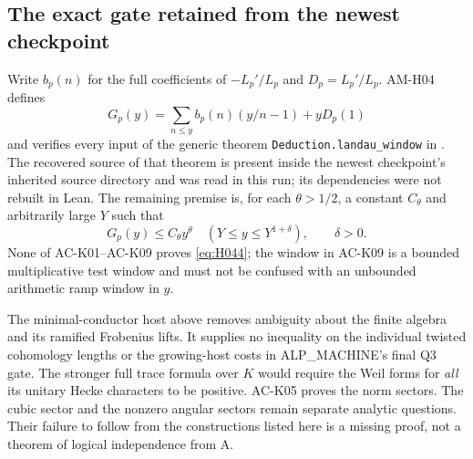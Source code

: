 \subsection{The exact gate retained from the newest checkpoint}

Write $b_p(n)$ for the full coefficients of $-L_p'/L_p$ and
$D_p=L_p'/L_p$. AM-H04 defines
\[
 G_p(y)=\sum_{n\le y}b_p(n)(y/n-1)+yD_p(1)
\]
and verifies every input of the generic theorem
\texttt{Deduction.landau\_window} in
.
The recovered source of that theorem is present inside the
newest checkpoint's inherited source directory and was read
in this run; its dependencies were not rebuilt in Lean.
The remaining premise is, for each $\theta>1/2$, a constant
$C_\theta$ and arbitrarily large $Y$ such that
\begin{equation}
 G_p(y)\le C_\theta y^\theta
             \quad(Y\le y\le Y^{1+\delta}),\qquad\delta>0.
                                                               \label{eq:H044}
\end{equation}
None of AC-K01--AC-K09 proves \eqref{eq:H044}; the window in
AC-K09 is a bounded multiplicative test window and must not
be confused with an unbounded arithmetic ramp window in $y$.

The minimal-conductor host above removes ambiguity about the
finite algebra and its ramified Frobenius lifts. It supplies
no inequality on the individual twisted cohomology lengths
or the growing-host costs in ALP\_MACHINE's final Q3 gate.
The stronger full trace formula over $K$ would require the
Weil forms for \emph{all} its unitary Hecke characters to be
positive. AC-K05 proves the norm sectors. The cubic sector
and the nonzero angular sectors remain separate analytic
questions. Their failure to follow from the constructions
listed here is a missing proof, not a theorem of logical
independence from A.

